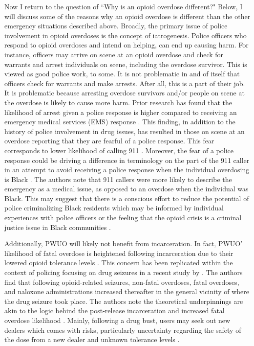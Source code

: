 Now I return to the question of ``Why is an opioid overdose different?" Below, I will discuss some of the reasons why an opioid overdose is different than the other emergency situations described above. Broadly, the primary issue of police involvement in opioid overdoses is the concept of iatrogenesis. Police officers who respond to opioid overdoses and intend on helping, can end up causing harm. For instance, officers may arrive on scene at an opioid overdose and check for warrants and arrest individuals on scene, including the overdose survivor. This is viewed as good police work, to some. It is not problematic in and of itself that officers check for warrants and make arrests. After all, this is a part of their job. It is problematic because arresting overdose survivors and/or people on scene at the overdose is likely to cause more harm. Prior research has found that the likelihood of arrest given a police response is higher compared to receiving an emergency medical services (EMS) response \parencite{lowder_twoyear_2020}. This finding, in addition to the history of police involvement in drug issues, has resulted in those on scene at an overdose reporting that they are fearful of a police response. This fear corresponds to lower likelihood of calling 911 \parencite{bohnert_policing_2011, van_der_meulen_thats_2021}. Moreover, the fear of a police response could be driving a difference in terminology on the part of the 911 caller in an attempt to avoid receiving a police response when the individual overdosing is Black \parencite{atkins_disparities_2024}. The authors note that 911 callers were more likely to describe the emergency as a medical issue, as opposed to an overdose when the individual was Black. This may suggest that there is a conscious effort to reduce the potential of police criminalizing Black residents which may be informed by individual experiences with police officers or the feeling that the opioid crisis is a criminal justice issue in Black communities \parencite{seo_thats_2023}. 


Additionally, PWUO will likely not benefit from incarceration. In fact, PWUO’ likelihood of fatal overdose is heightened following incarceration due to their lowered opioid tolerance levels \parencite{binswanger_clinical_2016, merrall_meta-analysis_2010}. This concern has been replicated within the context of policing focusing on drug seizures in a recent study by \textcite{ray_spatiotemporal_2023}. The authors find that following opioid-related seizures, non-fatal overdoses, fatal overdoses, and naloxone administrations increased thereafter in the general vicinity of where the drug seizure took place. The authors note the theoretical underpinnings are akin to the logic behind the post-release incarceration and increased fatal overdose likelihood \parencite{seaman_mortality_1998}. Mainly, following a drug bust, users may seek out new dealers which comes with risks, particularly uncertainty regarding the safety of the dose from a new dealer and unknown tolerance levels \parencite{ray_spatiotemporal_2023}.

